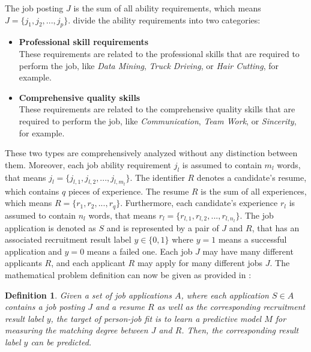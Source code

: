 \documentclass[draft,final]{thesisclass} %
\newtheorem{definition}{Definition}
\begin{document}
The job posting $J$ is the sum of all ability requirements, which means $J = \{j_1,j_2,...,j_p\}$.
\textcite[7]{pj_fit_ml} divide the ability requirements into two categories:
\begin{itemize}
    \item \textbf{Professional skill requirements}\\
    These requirements are related to the professional skills that are required to perform the job, like \textit{Data Mining}, \textit{Truck Driving}, or \textit{Hair Cutting}, for example.
    \item \textbf{Comprehensive quality skills}\\
    These requirements are related to the comprehensive quality skills that are required to perform the job, like \textit{Communication}, \textit{Team Work}, or \textit{Sincerity}, for example.
\end{itemize}
These two types are comprehensively analyzed without any distinction between them.
Moreover, each job ability requirement $j_l$ is assumed to contain $m_l$ words, that means $j_l = \{j_{l,1},j_{l,2},...,j_{l,m_l}\}$.
The identifier $R$ denotes a candidate's resume, which contains $q$ pieces of experience.
The resume $R$ is the sum of all experiences, which means $R = \{r_1,r_2,...,r_q\}$.
Furthermore, each candidate's experience $r_l$ is assumed to contain $n_l$ words, that means $r_l = \{r_{l,1},r_{l,2},...,r_{l,n_l}\}$.
The job application is denoted as $S$ and is represented by a pair of $J$ and $R$, that has an associated recruitment result label $y \in \{0,1\}$ where $y = 1$ means a successful application and $y = 0$ means a failed one.
Each job $J$ may have many different applicants $R$, and each applicant $R$ may apply for many different jobs $J$.
The mathematical problem definition can now be given as provided in \textcite[8]{pj_fit_ml}:
\begin{definition}
    Given a set of job applications $A$, where each application $S \in A$ contains a job posting $J$ and a resume $R$ as well as the corresponding recruitment result label $y$, the target of person-job fit is to learn a predictive model $M$ for measuring the matching degree between $J$ and $R$. Then, the corresponding result label $y$ can be predicted. 
\end{definition}
\end{document}
